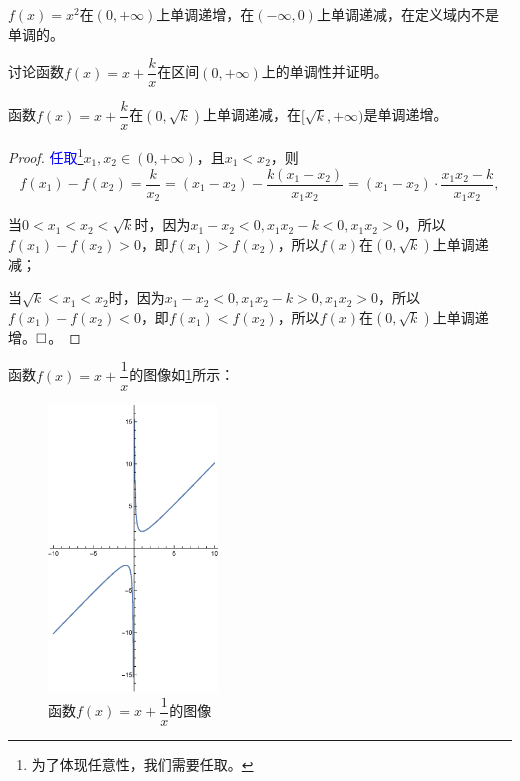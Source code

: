 \documentclass[lang=cn,math=cm,chinesefont=nofont,11pt,scheme=chinese,onecol]{elegantbook}
\begin{document}
\begin{example}
  $f(x)=x^2$在$(0,+\infty)$上单调递增，在$(-\infty,0)$上单调递减，在定义域内不是单调的。
\end{example}

\begin{spacing}{1.8}
  \begin{example}
    讨论函数$f(x)=x+\dfrac{k}{x}$在区间$(0,+\infty)$上的单调性并证明。
  \end{example}

  \begin{solution}
    函数$f(x)=x+\dfrac{k}{x}$在$(0,\sqrt{k})$上单调递减，在$[\sqrt{k},+\infty)$是单调递增。
  \end{solution}

  \begin{proof}
    \textcolor{blue}{任取}\footnote{为了体现任意性，我们需要任取。}$x_1,x_2\in (0,+\infty)$，且$x_1<x_2$，则$$f(x_1)-f(x_2)=\dfrac{k}{x_2}=(x_1-x_2)-\dfrac{k(x_1-x_2)}{x_1 x_2}=(x_1-x_2)\cdot \dfrac{x_1x_2-k}{x_1x_2},$$

    当$0<x_1<x_2<\sqrt{k}$时，因为$x_1-x_2<0,x_1x_2-k<0,x_1x_2>0$，所以$f(x_1)-f(x_2)>0$，即$f(x_1)>f(x_2)$，所以$f(x)$在$(0,\sqrt{k})$上单调递减；

    当$\sqrt{k}<x_1<x_2$时，因为$x_1-x_2<0,x_1x_2-k>0,x_1x_2>0$，所以$f(x_1)-f(x_2)<0$，即$f(x_1)<f(x_2)$，所以$f(x)$在$(0,\sqrt{k})$上单调递增。$\hfill\square$。 
  \end{proof}

\end{spacing}

\begin{remark}
  函数$f(x)=x+\dfrac{1}{x}$的图像如\ref{img:2.2.2function}所示：
\end{remark}

\begin{figure}[h]
  \centering
  \includegraphics[width=0.4\textwidth]{image/2.2.2function.eps}
  \caption{函数$f(x)=x+\dfrac{1}{x}$的图像}
  \label{img:2.2.2function}
\end{figure}
\end{document}
